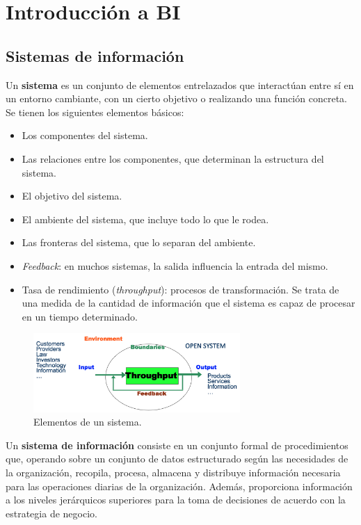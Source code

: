 \chapter{Introducción a BI}\label{Chapter1} 

\section{Sistemas de información}

Un \textbf{sistema} es un conjunto de elementos entrelazados que interactúan entre sí en un entorno cambiante, con un cierto objetivo o realizando una función concreta. Se tienen los siguientes elementos básicos:
\begin{itemize}
\item Los componentes del sistema. 
\item Las relaciones entre los componentes, que determinan la estructura del sistema.
\item El objetivo del sistema.
\item El ambiente del sistema, que incluye todo lo que le rodea.
\item Las fronteras del sistema, que lo separan del ambiente.
\item \textit{Feedback}: en muchos sistemas, la salida influencia la entrada del mismo.
\item Tasa de rendimiento (\textit{throughput}): procesos de transformación. Se trata de una medida de la cantidad de información que el sistema es capaz de procesar en un tiempo determinado.
\end{itemize}

\begin{figure}[h]
\centering
\includegraphics[width=0.7\textwidth]{fotos/1.png}
\caption{Elementos de un sistema.}
\label{fig:1}
\end{figure}

Un \textbf{sistema de información} consiste en un conjunto formal de procedimientos que, operando sobre un conjunto de datos estructurado según las necesidades de la organización, recopila, procesa, almacena y distribuye información necesaria para las operaciones diarias de la organización. Además, proporciona información a los niveles jerárquicos superiores para la toma de decisiones de acuerdo con la estrategia de negocio. \\

